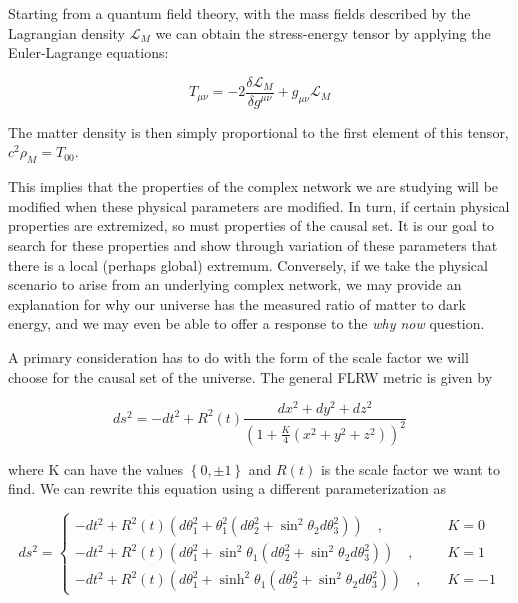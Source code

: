 \documentclass[preprint,notitlepage,amsmath,amssymb,floatfix]{revtex4-1}
\begin{document}
\noindent Starting from a quantum field theory, with the mass fields described by the Lagrangian density $\mathcal{L}_M$ we can obtain the stress-energy tensor by applying the Euler-Lagrange equations:

\begin{equation}
\label{eq:EL_stress_energy}
T_{\mu\nu} = -2\frac{\delta\mathcal{L}_M}{\delta g^{\mu\nu}} + g_{\mu\nu}\mathcal{L}_M
\end{equation}

\noindent The matter density is then simply proportional to the first element of this tensor, $c^2\rho_M = T_{00}$. \par
This implies that the properties of the complex network we are studying will be modified when these physical parameters are modified.
In turn, if certain physical properties are extremized, so must properties of the causal set.
It is our goal to search for these properties and show through variation of these parameters that there is a local (perhaps global) extremum.
Conversely, if we take the physical scenario to arise from an underlying complex network, we may provide an explanation for why our universe has the measured ratio of matter to dark energy, and we may even be able to offer a response to the \textit{why now} question. \par
A primary consideration has to do with the form of the scale factor we will choose for the causal set of the universe.  The general FLRW metric is given by

\begin{equation}
ds^2 = -dt^2 + R^2\left(t\right)\frac{dx^2 + dy^2 + dz^2}{\left(1 + \frac{K}{4}\left(x^2+y^2+z^2\right)\right)^2}
\end{equation}

\noindent where K can have the values $\left\{0, \pm 1\right\}$ and $R\left(t\right)$ is the scale factor we want to find.  We can rewrite this equation using a different parameterization as

\begin{equation}\label{ds^2}
ds^2 = 
\begin{cases}
-dt^2 + R^2\left(t\right)\left(d\theta_1^2 + \theta_1^2\left(d\theta_2^2+\sin^2\theta_2 d\theta_3^2\right)\right)\quad, & \quad K = 0 \\
-dt^2 + R^2\left(t\right)\left(d\theta_1^2 + \sin^2\theta_1\left(d\theta_2^2 + \sin^2\theta_2 d\theta_3^2\right)\right)\quad, & \quad K = 1 \\
-dt^2 + R^2\left(t\right)\left(d\theta_1^2 + \sinh^2\theta_1\left(d\theta_2^2 + \sin^2\theta_2 d\theta_3^2\right)\right)\quad, & \quad K = -1
\end{cases}
\end{equation}
\end{document}
